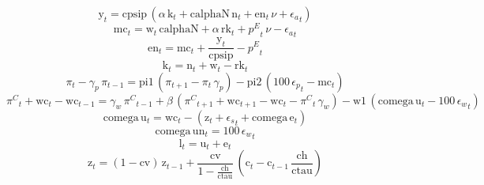 \begin{dmath}
{{\mathrm{y}}}_{t}={{\mathrm{cpsip}}}\, \left({{\alpha}}\, {{\mathrm{k}}}_{t}+{{\mathrm{calphaN}}}\, {{\mathrm{n}}}_{t}+{{\mathrm{en}}}_{t}\, {{\nu}}+{{\epsilon_{a}}}_{t}\right)
\end{dmath}
\begin{dmath}
{{\mathrm{mc}}}_{t}={{\mathrm{w}}}_{t}\, {{\mathrm{calphaN}}}+{{\alpha}}\, {{\mathrm{rk}}}_{t}+{{p^{E}}}_{t}\, {{\nu}}-{{\epsilon_{a}}}_{t}
\end{dmath}
\begin{dmath}
{{\mathrm{en}}}_{t}={{\mathrm{mc}}}_{t}+\frac{{{\mathrm{y}}}_{t}}{{{\mathrm{cpsip}}}}-{{p^{E}}}_{t}
\end{dmath}
\begin{dmath}
{{\mathrm{k}}}_{t}={{\mathrm{n}}}_{t}+{{\mathrm{w}}}_{t}-{{\mathrm{rk}}}_{t}
\end{dmath}
\begin{dmath}
{{\pi}}_{t}-{{\gamma_{p}}}\, {{\pi}}_{t-1}={{\mathrm{pi1}}}\, \left({{\pi}}_{t+1}-{{\pi}}_{t}\, {{\gamma_{p}}}\right)-{{\mathrm{pi2}}}\, \left(100\, {{\epsilon_{p}}}_{t}-{{\mathrm{mc}}}_{t}\right)
\end{dmath}
\begin{dmath}
{{\pi^{C}}}_{t}+{{\mathrm{wc}}}_{t}-{{\mathrm{wc}}}_{t-1}={{\gamma_{w}}}\, {{\pi^{C}}}_{t-1}+{{\beta}}\, \left({{\pi^{C}}}_{t+1}+{{\mathrm{wc}}}_{t+1}-{{\mathrm{wc}}}_{t}-{{\pi^{C}}}_{t}\, {{\gamma_{w}}}\right)-{{\mathrm{w1}}}\, \left({{\mathrm{comega}}}\, {{\mathrm{u}}}_{t}-100\, {{\epsilon_{w}}}_{t}\right)
\end{dmath}
\begin{dmath}
{{\mathrm{comega}}}\, {{\mathrm{u}}}_{t}={{\mathrm{wc}}}_{t}-\left({{\mathrm{z}}}_{t}+{{\epsilon_{s}}}_{t}+{{\mathrm{comega}}}\, {{\mathrm{e}}}_{t}\right)
\end{dmath}
\begin{dmath}
{{\mathrm{comega}}}\, {{\mathrm{un}}}_{t}=100\, {{\epsilon_{w}}}_{t}
\end{dmath}
\begin{dmath}
{{\mathrm{l}}}_{t}={{\mathrm{u}}}_{t}+{{\mathrm{e}}}_{t}
\end{dmath}
\begin{dmath}
{{\mathrm{z}}}_{t}=\left(1-{{\mathrm{cv}}}\right)\, {{\mathrm{z}}}_{t-1}+\frac{{{\mathrm{cv}}}}{1-\frac{{{\mathrm{ch}}}}{{{\mathrm{ctau}}}}}\, \left({{\mathrm{c}}}_{t}-{{\mathrm{c}}}_{t-1}\, \frac{{{\mathrm{ch}}}}{{{\mathrm{ctau}}}}\right)
\end{dmath}
